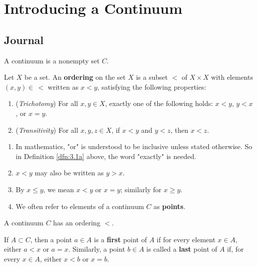 \documentclass[../main.tex]{subfiles}
\begin{document}
\chapter{Introducing a Continuum}\label{sct:3}
\section{Journal}
\begin{axiom}\label{axm:3.1}
    A continuum is a nonempty set $C$.
\end{axiom}

\begin{definition}\label{dfn:3.1}
    Let $X$ be a set. An \textbf{ordering} on the set $X$ is a subset $<$ of $X\times X$ with elements $(x,y)\in\, <$ written as $x<y$, satisfying the following properties:
    \begin{enumerate}[label={\alph*)},ref={\thetheorem\alph*}]
        \item \label{dfn:3.1a}(\emph{Trichotomy}) For all $x,y\in X$, exactly one of the following holds: $x<y$, $y<x$, or $x=y$.
        \item \label{dfn:3.1b}(\emph{Transitivity}) For all $x,y,z\in X$, if $x<y$ and $y<z$, then $x<z$.
    \end{enumerate}
\end{definition}

\begin{remark}\label{rmk:3.2}\leavevmode
    \begin{enumerate}[label={\alph*)}]
        \item In mathematics, "or" is understood to be inclusive unless stated otherwise. So in Definition \ref{dfn:3.1a} above, the word "exactly" is needed.
        \item $x<y$ may also be written as $y>x$.
        \item By $x\leq y$, we mean $x<y$ or $x=y$; similarly for $x\geq y$.
        \item We often refer to elements of a continuum $C$ as \textbf{points}.
    \end{enumerate}
\end{remark}

\begin{axiom}\label{axm:3.2}
    A continuum $C$ has an ordering $<$.
\end{axiom}

\begin{definition}\label{dfn:3.3}
    If $A\subset C$, then a point $a\in A$ is a \textbf{first} point of $A$ if for every element $x\in A$, either $a<x$ or $a=x$. Similarly, a point $b\in A$ is called a \textbf{last} point of $A$ if, for every $x\in A$, either $x<b$ or $x=b$.
\end{definition}
\end{document}
